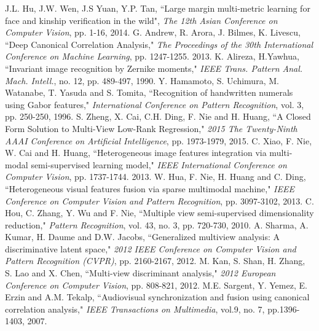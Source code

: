 \documentclass[journal]{IEEEtran}
\begin{document}
\begin{thebibliography}{1}
J.L. Hu, J.W. Wen, J.S Yuan, Y.P. Tan, ``Large margin multi-metric learning for face and kinship verification in the wild", \emph{The 12th Asian Conference on Computer Vision}, pp. 1-16, 2014.
G. Andrew, R. Arora, J. Bilmes, K. Livescu, ``Deep Canonical Correlation Analysis," \emph{The Proceedings of the 30th International Conference on Machine Learning}, pp. 1247-1255. 2013.
K. Alireza, H.Yawhua, ``Invariant image recognition by Zernike moments," \emph{IEEE Trans. Pattern Anal. Mach. Intell.}, no. 12, pp. 489-497, 1990.
Y. Hamamoto, S. Uchimura, M. Watanabe, T. Yasuda and S. Tomita, ``Recognition of handwritten numerals using Gabor features," \emph{International Conference on Pattern Recognition}, vol. 3, pp. 250-250, 1996.
S. Zheng, X. Cai, C.H. Ding, F. Nie and H. Huang, ``A Closed Form Solution to Multi-View Low-Rank Regression," \emph{2015 The Twenty-Ninth AAAI Conference on Artificial Intelligence}, pp. 1973-1979, 2015.
C. Xiao, F. Nie, W. Cai and H. Huang, ``Heterogeneous image features integration via multi-modal semi-supervised learning model," \emph{IEEE International Conference on Computer Vision}, pp. 1737-1744. 2013.
W. Hua, F. Nie, H. Huang and C. Ding, ``Heterogeneous visual features fusion via sparse multimodal machine," \emph{IEEE Conference on Computer Vision and Pattern Recognition}, pp. 3097-3102, 2013.
C. Hou, C. Zhang, Y. Wu and F. Nie, ``Multiple view semi-supervised dimensionality reduction," \emph{Pattern Recognition}, vol. 43, no. 3, pp. 720-730, 2010.
 A. Sharma, A. Kumar, H. Daume and D.W. Jacobs, ``Generalized multiview analysis: A discriminative latent space,"  \emph{2012 IEEE Conference on Computer Vision and Pattern Recognition (CVPR)}, pp. 2160-2167, 2012.
M. Kan, S. Shan, H. Zhang, S. Lao and X. Chen, ``Multi-view discriminant analysis,"  \emph{2012 European Conference on Computer Vision}, pp. 808-821, 2012.
M.E. Sargent, Y. Yemez, E. Erzin and A.M. Tekalp, ``Audiovisual synchronization and fusion using canonical correlation analysis," \emph{IEEE Transactions on Multimedia}, vol.9, no. 7, pp.1396-1403, 2007.
\end{thebibliography}
\end{document}

